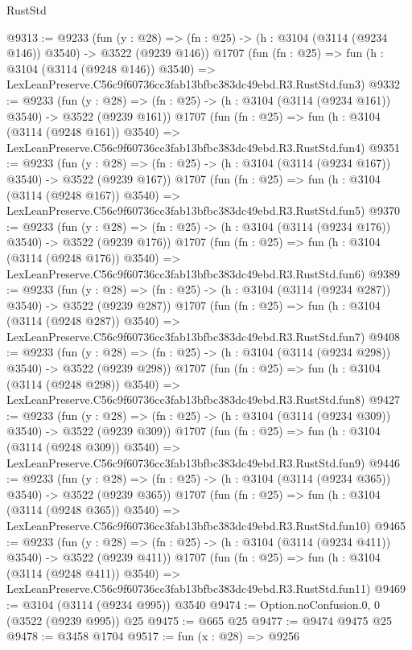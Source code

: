 \begin{lexlean}{RustStd}
\begin{coremodule}
@9313 := @9233
    (fun (y : @28) => (fn : @25) -> (h : @3104 (@3114 (@9234 @146)) @3540) -> @3522 (@9239 @146))
    @1707
    (fun (fn : @25) =>
    fun (h : @3104 (@3114 (@9248 @146)) @3540) =>
    LexLeanPreserve.C56c9f60736cc3fab13bfbc383dc49ebd.R3.RustStd.fun3)
@9332 := @9233
    (fun (y : @28) => (fn : @25) -> (h : @3104 (@3114 (@9234 @161)) @3540) -> @3522 (@9239 @161))
    @1707
    (fun (fn : @25) =>
    fun (h : @3104 (@3114 (@9248 @161)) @3540) =>
    LexLeanPreserve.C56c9f60736cc3fab13bfbc383dc49ebd.R3.RustStd.fun4)
@9351 := @9233
    (fun (y : @28) => (fn : @25) -> (h : @3104 (@3114 (@9234 @167)) @3540) -> @3522 (@9239 @167))
    @1707
    (fun (fn : @25) =>
    fun (h : @3104 (@3114 (@9248 @167)) @3540) =>
    LexLeanPreserve.C56c9f60736cc3fab13bfbc383dc49ebd.R3.RustStd.fun5)
@9370 := @9233
    (fun (y : @28) => (fn : @25) -> (h : @3104 (@3114 (@9234 @176)) @3540) -> @3522 (@9239 @176))
    @1707
    (fun (fn : @25) =>
    fun (h : @3104 (@3114 (@9248 @176)) @3540) =>
    LexLeanPreserve.C56c9f60736cc3fab13bfbc383dc49ebd.R3.RustStd.fun6)
@9389 := @9233
    (fun (y : @28) => (fn : @25) -> (h : @3104 (@3114 (@9234 @287)) @3540) -> @3522 (@9239 @287))
    @1707
    (fun (fn : @25) =>
    fun (h : @3104 (@3114 (@9248 @287)) @3540) =>
    LexLeanPreserve.C56c9f60736cc3fab13bfbc383dc49ebd.R3.RustStd.fun7)
@9408 := @9233
    (fun (y : @28) => (fn : @25) -> (h : @3104 (@3114 (@9234 @298)) @3540) -> @3522 (@9239 @298))
    @1707
    (fun (fn : @25) =>
    fun (h : @3104 (@3114 (@9248 @298)) @3540) =>
    LexLeanPreserve.C56c9f60736cc3fab13bfbc383dc49ebd.R3.RustStd.fun8)
@9427 := @9233
    (fun (y : @28) => (fn : @25) -> (h : @3104 (@3114 (@9234 @309)) @3540) -> @3522 (@9239 @309))
    @1707
    (fun (fn : @25) =>
    fun (h : @3104 (@3114 (@9248 @309)) @3540) =>
    LexLeanPreserve.C56c9f60736cc3fab13bfbc383dc49ebd.R3.RustStd.fun9)
@9446 := @9233
    (fun (y : @28) => (fn : @25) -> (h : @3104 (@3114 (@9234 @365)) @3540) -> @3522 (@9239 @365))
    @1707
    (fun (fn : @25) =>
    fun (h : @3104 (@3114 (@9248 @365)) @3540) =>
    LexLeanPreserve.C56c9f60736cc3fab13bfbc383dc49ebd.R3.RustStd.fun10)
@9465 := @9233
    (fun (y : @28) => (fn : @25) -> (h : @3104 (@3114 (@9234 @411)) @3540) -> @3522 (@9239 @411))
    @1707
    (fun (fn : @25) =>
    fun (h : @3104 (@3114 (@9248 @411)) @3540) =>
    LexLeanPreserve.C56c9f60736cc3fab13bfbc383dc49ebd.R3.RustStd.fun11)
@9469 := @3104 (@3114 (@9234 @995)) @3540
@9474 := Option.noConfusion.{0, 0} (@3522 (@9239 @995)) @25
@9475 := @665 @25
@9477 := @9474 @9475 @25
@9478 := @3458 @1704
@9517 := fun (x : @28) =>
  @9256

\end{coremodule}
\end{lexlean}
